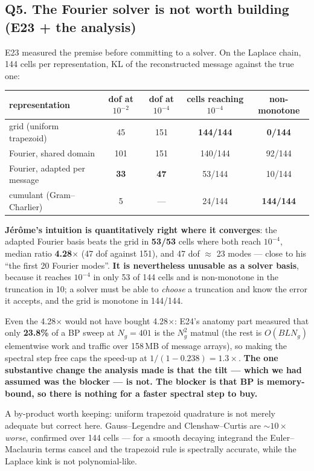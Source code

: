 \documentclass[10pt,a4paper]{article}
\newcommand{\nsites}{L}
\newcommand{\st}[1]{\textbf{#1}}
\begin{document}
\subsection{Q5. The Fourier solver is not worth building (E23 + the analysis)}
\label{sec:q5res}

E23 measured the premise before committing to a solver. On the Laplace chain, 144 cells per
representation, KL of the reconstructed message against the true one:

\medskip
\noindent\begin{tabular}{@{}l cc cc@{}}
\toprule
representation & dof at $10^{-2}$ & dof at $10^{-4}$ & cells reaching $10^{-4}$ & non-monotone \\
\midrule
grid (uniform trapezoid) & 45 & 151 & \st{144/144} & \st{0/144} \\
Fourier, shared domain & 101 & 151 & 140/144 & 92/144 \\
Fourier, adapted per message & \st{33} & \st{47} & 53/144 & 10/144 \\
cumulant (Gram--Charlier) & 5 & --- & 24/144 & \st{144/144} \\
\bottomrule
\end{tabular}

\medskip
\st{Jérôme's intuition is quantitatively right where it converges}: the adapted Fourier basis
beats the grid in \st{53/53} cells where both reach $10^{-4}$, median ratio \st{4.28$\times$}
(47 dof against 151), and 47 dof $\approx$ 23 modes --- close to his ``the first 20 Fourier
modes''. \st{It is nevertheless unusable as a solver basis}, because it reaches $10^{-4}$ in
only 53 of 144 cells and is non-monotone in the truncation in 10; a solver must be able to
\emph{choose} a truncation and know the error it accepts, and the grid is monotone in 144/144.

Even the 4.28$\times$ would not have bought 4.28$\times$: E24's anatomy part measured that only
\st{23.8\%} of a BP sweep at $N_g=401$ is the $N_g^2$ matmul (the rest is $O(B\nsites N_g)$
elementwise work and traffic over 158\,MB of message arrays), so making the spectral step free
caps the speed-up at $1/(1-0.238) = 1.3\times$. \st{The one substantive change the analysis made
is that the tilt --- which we had assumed was the blocker --- is not. The blocker is that BP is
memory-bound, so there is nothing for a faster spectral step to buy.}

A by-product worth keeping: uniform trapezoid quadrature is not merely adequate but correct
here. Gauss--Legendre and Clenshaw--Curtis are $\sim\!10\times$ \emph{worse}, confirmed over 144
cells --- for a smooth decaying integrand the Euler--Maclaurin terms cancel and the trapezoid
rule is spectrally accurate, while the Laplace kink is not polynomial-like.
\end{document}
